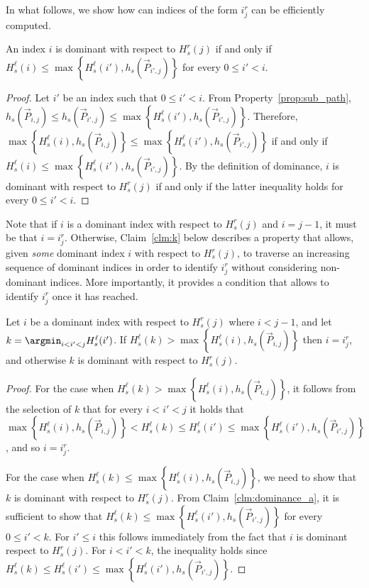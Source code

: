 In what follows, we show how can indices of the form $i^r_j$ can be efficiently computed.

\begin{claim}
	\label{clm:dominance_a}
	An index $i$ is dominant with respect to $H^r_s(j)$ if and only if $H^\ell_s(i) \leq \max\left\{H^\ell_s(i'), h_s(\vec{P}_{i', j})\right\}$ for every $0 \leq i' < i$.
\end{claim}

\begin{proof}
	Let $i'$ be an index such that $0 \leq i' < i$.
	From Property~\ref{prop:sub_path}, $h_s(\vec{P}_{i, j}) \leq h_s(\vec{P}_{i', j}) \leq \max\left\{H^\ell_s(i'), h_s(\vec{P}_{i', j})\right\}$. Therefore, $\max\left\{H^\ell_s(i), h_s(\vec{P}_{i, j})\right\} \leq \max\left\{H^\ell_s(i'), h_s(\vec{P}_{i', j})\right\}$ if and only if $H^\ell_s(i) \leq \max\left\{H^\ell_s(i'), h_s(\vec{P}_{i', j})\right\}$. By the definition of dominance, $i$ is dominant with respect to $H^r_s(j)$ if and only if the latter inequality holds for every $0 \leq i' < i$.
\end{proof}

Note that if $i$ is a dominant index with respect to $H^r_s(j)$ and $i = j-1$, it must be that $i = i^r_j$. Otherwise, Claim~\ref{clm:k} below describes a property that allows, given \emph{some} dominant index $i$ with respect to $H^r_s(j)$, to traverse an increasing sequence of dominant indices in order to identify $i^r_j$ without considering non-dominant indices. More importantly, it provides a condition that allows to identify $i^r_j$ once it has reached.


\begin{claim}
	\label{clm:k}
	Let $i$ be a dominant index with respect to $H^r_s(j)$ where $i < j-1$, and let $k = \argmin_{i < i' < j} H^\ell_s(i')$. 
	If $H^\ell_s(k) > \max\left\{H^\ell_s(i), h_s(\vec{P}_{i, j})\right\}$ then $i = i^r_j$, and otherwise $k$ is dominant with respect to $H^r_s(j)$.
\end{claim}

\begin{proof}
	For the case when $H^\ell_s(k) > \max\left\{H^\ell_s(i), h_s(\vec{P}_{i, j})\right\}$, it follows from the selection of $k$ that for every $i < i' < j$ it holds that $\max\left\{H^\ell_s(i), h_s(\vec{P}_{i, j})\right\} < H^\ell_s(k) \leq H^\ell_s(i') \leq \max\left\{H^\ell_s(i'), h_s(\vec{P}_{i', j})\right\}$, and so $i = i^r_j$.
	
	For the case when $H^\ell_s(k) \leq \max\left\{H^\ell_s(i), h_s(\vec{P}_{i, j})\right\}$, we need to show that $k$ is dominant with respect to $H^r_s(j)$. From Claim~\ref{clm:dominance_a}, it is sufficient to show that $H^\ell_s(k) \leq \max\left\{H^\ell_s(i'), h_s(\vec{P}_{i', j})\right\}$ for every $0 \leq i' < k$. For $i' \leq i$ this follows immediately from the fact that $i$ is dominant respect to $H^r_s(j)$. For $i < i' < k$, the inequality holds since $H^\ell_s(k) \leq H^\ell_s(i') \leq \max\left\{H^\ell_s(i'), h_s(\vec{P}_{i', j})\right\}$.
\end{proof}

